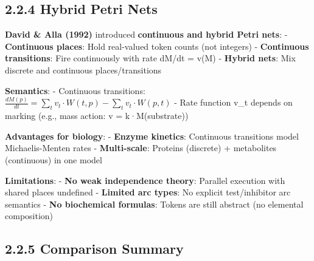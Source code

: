 \hypertarget{hybrid-petri-nets}{%
\subsection{2.2.4 Hybrid Petri Nets}\label{hybrid-petri-nets}}

\textbf{David \& Alla (1992)} introduced \textbf{continuous and hybrid
Petri nets}: - \textbf{Continuous places}: Hold real-valued token counts
(not integers) - \textbf{Continuous transitions}: Fire continuously with
rate dM/dt = v(M) - \textbf{Hybrid nets}: Mix discrete and continuous
places/transitions

\textbf{Semantics}: - Continuous transitions:
\(\frac{dM(p)}{dt} = \sum_{t} v_t \cdot W(t,p) - \sum_{t} v_t \cdot W(p,t)\)
- Rate function v\_t depends on marking (e.g., mass action: v =
k·M(substrate))

\textbf{Advantages for biology}: - \textbf{Enzyme kinetics}: Continuous
transitions model Michaelis-Menten rates - \textbf{Multi-scale}:
Proteins (discrete) + metabolites (continuous) in one model

\textbf{Limitations}: - \textbf{No weak independence theory}: Parallel
execution with shared places undefined - \textbf{Limited arc types}: No
explicit test/inhibitor arc semantics - \textbf{No biochemical
formulas}: Tokens are still abstract (no elemental composition)

\hypertarget{comparison-summary}{%
\subsection{2.2.5 Comparison Summary}\label{comparison-summary}}

